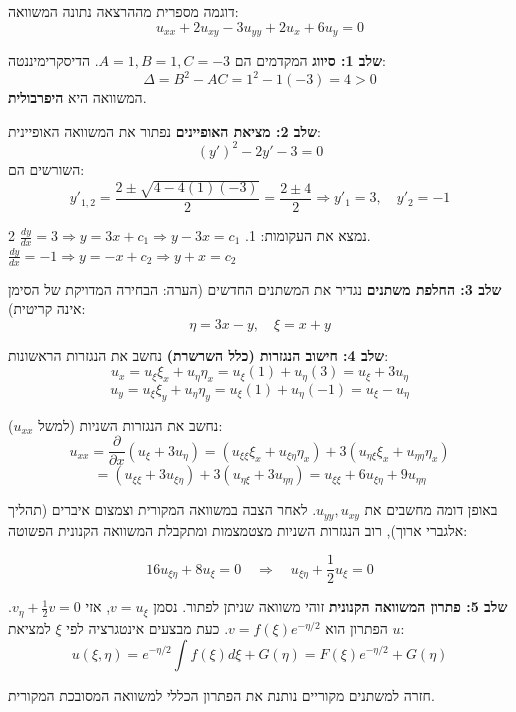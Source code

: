 \begin{examplebox}{דוגמה מספרית מההרצאה}
    נתונה המשוואה:
    \[ u_{xx} + 2u_{xy} - 3u_{yy} + 2u_x + 6u_y = 0 \]
    
    \textbf{שלב 1: סיווג}
    המקדמים הם $A=1, B=1, C=-3$.
    הדיסקרימיננטה:
    \[ \Delta = B^2 - AC = 1^2 - 1(-3) = 4 > 0 \]
    המשוואה היא \textbf{היפרבולית}.

    \textbf{שלב 2: מציאת האופיינים}
    נפתור את המשוואה האופיינית:
    \[ (y')^2 - 2y' - 3 = 0 \]
    השורשים הם:
    \[ y'_{1,2} = \frac{2 \pm \sqrt{4 - 4(1)(-3)}}{2} = \frac{2 \pm 4}{2} \Rightarrow y'_1 = 3, \quad y'_2 = -1 \]
    
    נמצא את העקומות:
    1. $\frac{dy}{dx} = 3 \Rightarrow y = 3x + c_1 \Rightarrow y - 3x = c_1$
    2. $\frac{dy}{dx} = -1 \Rightarrow y = -x + c_2 \Rightarrow y + x = c_2$

    \textbf{שלב 3: החלפת משתנים}
    נגדיר את המשתנים החדשים (הערה: הבחירה המדויקת של הסימן אינה קריטית):
    \[ \eta = 3x - y, \quad \xi = x + y \]
    
    \textbf{שלב 4: חישוב הנגזרות (כלל השרשרת)}
    נחשב את הנגזרות הראשונות:
    \[ u_x = u_\xi \xi_x + u_\eta \eta_x = u_\xi(1) + u_\eta(3) = u_\xi + 3u_\eta \]
    \[ u_y = u_\xi \xi_y + u_\eta \eta_y = u_\xi(1) + u_\eta(-1) = u_\xi - u_\eta \]
    
    נחשב את הנגזרות השניות (למשל $u_{xx}$):
    \[ u_{xx} = \frac{\partial}{\partial x}(u_\xi + 3u_\eta) = (u_{\xi\xi}\xi_x + u_{\xi\eta}\eta_x) + 3(u_{\eta\xi}\xi_x + u_{\eta\eta}\eta_x) \]
    \[ = (u_{\xi\xi} + 3u_{\xi\eta}) + 3(u_{\eta\xi} + 3u_{\eta\eta}) = u_{\xi\xi} + 6u_{\xi\eta} + 9u_{\eta\eta} \]
    
    באופן דומה מחשבים את $u_{yy}, u_{xy}$. לאחר הצבה במשוואה המקורית וצמצום איברים (תהליך אלגברי ארוך), רוב הנגזרות השניות מצטמצמות ומתקבלת המשוואה הקנונית הפשוטה:
    
    \[ 16 u_{\xi\eta} + 8 u_\xi = 0 \quad \Rightarrow \quad u_{\xi\eta} + \frac{1}{2}u_\xi = 0 \]
    
    \textbf{שלב 5: פתרון המשוואה הקנונית}
    זוהי משוואה שניתן לפתור. נסמן $v = u_\xi$, אזי $v_\eta + \frac{1}{2}v = 0$.
    הפתרון הוא $v = f(\xi)e^{-\eta/2}$.
    כעת מבצעים אינטגרציה לפי $\xi$ למציאת $u$:
    \[ u(\xi, \eta) = e^{-\eta/2} \int f(\xi) d\xi + G(\eta) = F(\xi)e^{-\eta/2} + G(\eta) \]
    
    חזרה למשתנים מקוריים נותנת את הפתרון הכללי למשוואה המסובכת המקורית.
\end{examplebox}
